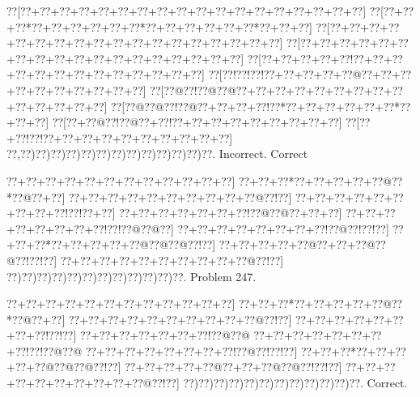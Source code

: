 \documentclass[a5paper]{article}
\begin{document}
\begin{center}
{\goo
\0??[\0??+\0??+\0??+\0??+\0??+\0??+\0??+\0??+\0??+\0??+\0??+\0??+\0??+\0??+\0??+\0??+\0??+\0??]
\0??[\0??+\0??+\0??*\0??+\0??+\0??+\0??+\0??+\0??*\0??+\0??+\0??+\0??+\0??+\0??*\0??+\0??+\0??]
\0??[\0??+\0??+\0??+\0??+\0??+\0??+\0??+\0??+\0??+\0??+\0??+\0??+\0??+\0??+\0??+\0??+\0??+\0??]
\0??[\0??+\0??+\0??+\0??+\0??+\0??+\0??+\0??+\0??+\0??+\0??+\0??+\0??+\0??+\0??+\0??+\0??+\0??]
\0??[\0??+\0??+\0??+\0??+\0??!\0??+\0??+\0??+\0??+\0??+\0??+\0??+\0??+\0??+\0??+\0??+\0??+\0??]
\0??[\0??!\0??!\0??!\0??+\0??+\0??+\0??+\0??@\0??+\0??+\0??+\0??+\0??+\0??+\0??+\0??+\0??+\0??]
\0??[\0??@\0??!\0??@\0??@\0??+\0??+\0??+\0??+\0??+\0??+\0??+\0??+\0??+\0??+\0??+\0??+\0??+\0??]
\0??[\0??@\0??@\0??!\0??@\0??+\0??+\0??+\0??!\0??*\0??+\0??+\0??+\0??+\0??+\0??*\0??+\0??+\0??]
\0??[\0??+\0??@\0??!\0??@\0??+\0??!\0??+\0??+\0??+\0??+\0??+\0??+\0??+\0??+\0??]
\0??[\0??+\0??!\0??!\0??+\0??+\0??+\0??+\0??+\0??+\0??+\0??+\0??+\0??]
\0??,\0??)\0??)\0??)\0??)\0??)\0??)\0??)\0??)\0??)\0??)\0??)\0??)\0??.
}
Incorrect. Correct

\end{center}
\newpage
\begin{center}
{\goo
\0??+\0??+\0??+\0??+\0??+\0??+\0??+\0??+\0??+\0??+\0??+\0??]
\0??+\0??+\0??*\0??+\0??+\0??+\0??+\0??@\0??*\0??@\0??+\0??]
\0??+\0??+\0??+\0??+\0??+\0??+\0??+\0??+\0??+\0??@\0??!\0??]
\0??+\0??+\0??+\0??+\0??+\0??+\0??+\0??+\0??!\0??!\0??+\0??]
\0??+\0??+\0??+\0??+\0??+\0??+\0??!\0??@\0??@\0??+\0??+\0??]
\0??+\0??+\0??+\0??+\0??+\0??+\0??+\0??!\0??!\0??@\0??@\0??]
\0??+\0??+\0??+\0??+\0??+\0??+\0??+\0??!\0??@\0??!\0??!\0??]
\0??+\0??+\0??*\0??+\0??+\0??+\0??+\0??@\0??@\0??@\0??!\0??]
\0??+\0??+\0??+\0??+\0??@\0??+\0??+\0??@\0??@\0??!\0??!\0??]
\0??+\0??+\0??+\0??+\0??+\0??+\0??+\0??+\0??+\0??@\0??!\0??]
\0??)\0??)\0??)\0??)\0??)\0??)\0??)\0??)\0??)\0??)\0??)\0??.
}
Problem 247.

\end{center}
\begin{center}
{\goo
\0??+\0??+\0??+\0??+\0??+\0??+\0??+\0??+\0??+\0??+\0??+\0??]
\0??+\0??+\0??*\0??+\0??+\0??+\0??+\0??@\0??*\0??@\0??+\0??]
\0??+\0??+\0??+\0??+\0??+\0??+\0??+\0??+\0??+\0??@\0??!\0??]
\0??+\0??+\0??+\0??+\0??+\0??+\0??+\0??!\0??!\0??]
\0??+\0??+\0??+\0??+\0??+\0??+\0??!\0??@\0??@
\0??+\0??+\0??+\0??+\0??+\0??+\0??+\0??!\0??!\0??@\0??@
\0??+\0??+\0??+\0??+\0??+\0??+\0??+\0??!\0??@\0??!\0??!\0??]
\0??+\0??+\0??*\0??+\0??+\0??+\0??+\0??@\0??@\0??@\0??!\0??]
\0??+\0??+\0??+\0??+\0??@\0??+\0??+\0??@\0??@\0??!\0??!\0??]
\0??+\0??+\0??+\0??+\0??+\0??+\0??+\0??+\0??+\0??@\0??!\0??]
\0??)\0??)\0??)\0??)\0??)\0??)\0??)\0??)\0??)\0??)\0??)\0??.
}
Correct. 

\end{center}
\end{document}
